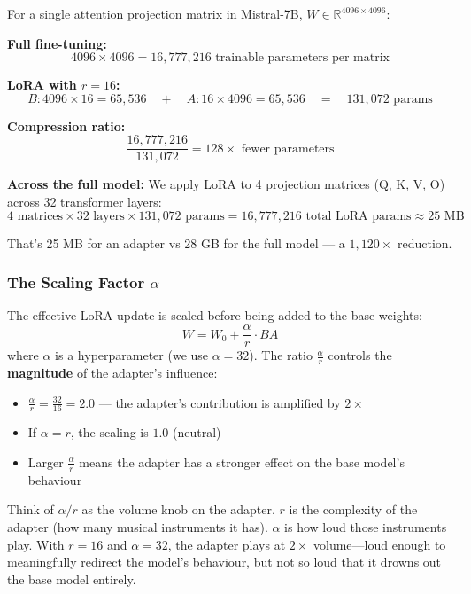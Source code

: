 \begin{examplebox}[\textcolor{white}{Worked Example: LoRA Parameter Count}]
For a single attention projection matrix in Mistral-7B, $W \in \mathbb{R}^{4096 \times 4096}$:

\textbf{Full fine-tuning:}
\[
4096 \times 4096 = 16{,}777{,}216 \text{ trainable parameters per matrix}
\]

\textbf{LoRA with $r = 16$:}
\[
B: 4096 \times 16 = 65{,}536 \quad + \quad A: 16 \times 4096 = 65{,}536 \quad = \quad 131{,}072 \text{ params}
\]

\textbf{Compression ratio:}
\[
\frac{16{,}777{,}216}{131{,}072} = 128\times \text{ fewer parameters}
\]

\textbf{Across the full model:} We apply LoRA to 4 projection matrices (Q, K, V, O) across 32 transformer layers:
\[
4 \text{ matrices} \times 32 \text{ layers} \times 131{,}072 \text{ params} = 16{,}777{,}216 \text{ total LoRA params} \approx 25 \text{ MB}
\]

That's 25 MB for an adapter vs 28 GB for the full model --- a $1{,}120\times$ reduction.
\end{examplebox}

\subsubsection{The Scaling Factor $\alpha$}

\begin{acadbox}[\textcolor{white}{Academic Definition}]
The effective LoRA update is scaled before being added to the base weights:
\[
W = W_0 + \frac{\alpha}{r} \cdot BA
\]
where $\alpha$ is a hyperparameter (we use $\alpha = 32$). The ratio $\frac{\alpha}{r}$ controls the \textbf{magnitude} of the adapter's influence:
\begin{itemize}
    \item $\frac{\alpha}{r} = \frac{32}{16} = 2.0$ --- the adapter's contribution is amplified by $2\times$
    \item If $\alpha = r$, the scaling is $1.0$ (neutral)
    \item Larger $\frac{\alpha}{r}$ means the adapter has a stronger effect on the base model's behaviour
\end{itemize}
\end{acadbox}

\begin{analogybox}[\textcolor{white}{Simple Analogy}]
Think of $\alpha / r$ as the volume knob on the adapter. $r$ is the complexity of the adapter (how many musical instruments it has). $\alpha$ is how loud those instruments play. With $r = 16$ and $\alpha = 32$, the adapter plays at $2\times$ volume---loud enough to meaningfully redirect the model's behaviour, but not so loud that it drowns out the base model entirely.
\end{analogybox}


